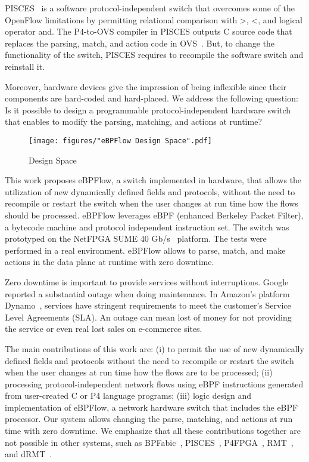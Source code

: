 PISCES~\cite{Shahbaz:2016:Pisces} is a software protocol-independent switch that overcomes some of the OpenFlow limitations by permitting relational comparison with >, <, and logical operator and. The P4-to-OVS compiler in PISCES outputs C source code that replaces
the parsing, match, and action code in OVS~\cite{Pfaff:2015:OpenVSwitch}. But, to change the functionality of the switch, PISCES requires to recompile the software switch and reinstall it.

Moreover, hardware devices give the impression of being inflexible since their components are hard-coded and hard-placed. We address the following question: Is it possible to design a programmable protocol-independent hardware switch that enables to modify the parsing, matching, and actions at runtime? 

 \begin{figure}[!htp]
 \centering
\texttt{[image: figures/"eBPFlow Design Space".pdf]}
 \caption{Design Space}
 \label{fig:03architecture}
 \end{figure}


This work proposes eBPFlow, a switch implemented in hardware, that allows the utilization of new dynamically defined fields and protocols, without the need to recompile or restart the switch when the user changes at run time how the flows should be processed. 
eBPFlow leverages eBPF (enhanced Berkeley Packet Filter), a bytecode machine and protocol independent instruction set. %
The switch was prototyped on the NetFPGA SUME 40 Gb/s~\cite{SUME2014} platform. The tests were performed in a real environment. eBPFlow allows to parse, match, and make actions in the data plane at runtime with zero downtime.

Zero downtime is important to provide services without interruptions.
Google~\cite{Jain:2013:BEG:2486001.2486019} reported a substantial outage when doing maintenance. In  Amazon's platform Dynamo~\cite{DeCandia:2007:DAH:1294261.1294281},  services have stringent requirements to meet the customer's Service Level Agreements (SLA).
An outage can mean lost of money for not providing the service or even real lost sales on e-commerce sites.



The main contributions of this work are: (i) to permit the use of new dynamically defined fields and protocols without the need to recompile or restart the switch when the user changes at run time how the flows are to be processed; (ii) processing protocol-independent network flows using eBPF instructions generated from user-created C or P4 language programs; (iii) logic design and implementation of eBPFlow, a network hardware switch that includes the eBPF processor. Our system allows changing the parse, matching, and actions at run time with zero downtime. We emphasize that all these contributions together are not possible in other systems, such as BPFabic~\cite{Jouet:2017:BPFabric}, PISCES~\cite{Shahbaz:2016:Pisces}, P4FPGA~\cite{p4fpga}, RMT~\cite{bosshart2013forwarding}, and dRMT~\cite{chole2017drmt}. 

